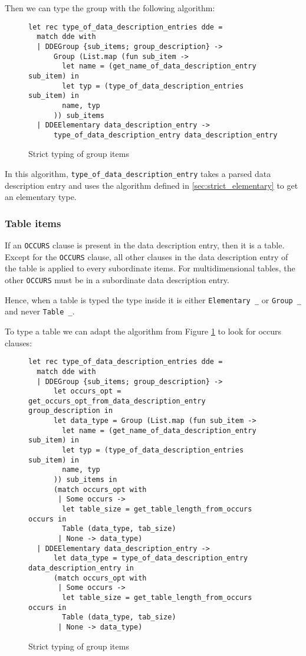 \documentclass[a4paper,10pt]{article}
\newcommand{\ocamli}[1]{\texttt{#1}}
\newcommand{\coboli}[1]{\texttt{#1}}
\begin{document}
Then we can type the group with the following algorithm:
\begin{figure}[H]
  \centering
  \begin{verbatim}
let rec type_of_data_description_entries dde =
  match dde with
  | DDEGroup {sub_items; group_description} ->
      Group (List.map (fun sub_item ->
        let name = (get_name_of_data_description_entry sub_item) in
        let typ = (type_of_data_description_entries sub_item) in
        name, typ
      )) sub_items
  | DDEElementary data_description_entry ->
      type_of_data_description_entry data_description_entry
  \end{verbatim}
  \caption{Strict typing of group items}
  \label{fig:strict_type_group}
\end{figure}
In this algorithm, \ocamli{type_of_data_description_entry} takes a parsed data description entry
and uses the algorithm defined in \ref{sec:strict_elementary} to get an elementary type.
\subsubsection{Table items}
If an \coboli{OCCURS} clause is present in the data description entry, then it is a table. Except for
the \coboli{OCCURS} clause, all other clauses in the data description entry of the table is applied
to every subordinate items. For multidimensional tables, the other \coboli{OCCURS} must be in
a subordinate data description entry.

Hence, when a table is typed the type inside it is either \ocamli{Elementary _} or \ocamli{Group _}
and never \ocamli{Table _}.

To type a table we can adapt the algorithm from Figure \ref{fig:strict_type_group} to look for
occurs clauses:
\begin{figure}[H]
  \centering
  \begin{verbatim}
let rec type_of_data_description_entries dde =
  match dde with
  | DDEGroup {sub_items; group_description} ->
      let occurs_opt = get_occurs_opt_from_data_description_entry group_description in
      let data_type = Group (List.map (fun sub_item ->
        let name = (get_name_of_data_description_entry sub_item) in
        let typ = (type_of_data_description_entries sub_item) in
        name, typ
      )) sub_items in
      (match occurs_opt with
       | Some occurs ->
        let table_size = get_table_length_from_occurs occurs in
        Table (data_type, tab_size)
       | None -> data_type)
  | DDEElementary data_description_entry ->
      let data_type = type_of_data_description_entry data_description_entry in
      (match occurs_opt with
       | Some occurs ->
        let table_size = get_table_length_from_occurs occurs in
        Table (data_type, tab_size)
       | None -> data_type)
  \end{verbatim}
  \caption{Strict typing of group items}
  \label{fig:strict_type_table}
\end{figure}
\end{document}
